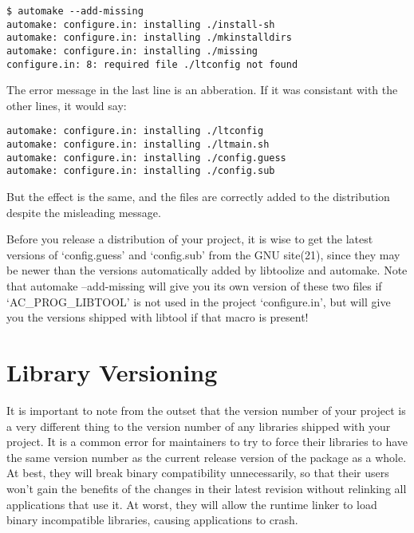\begin{verbatim}
$ automake --add-missing
automake: configure.in: installing ./install-sh
automake: configure.in: installing ./mkinstalldirs
automake: configure.in: installing ./missing
configure.in: 8: required file ./ltconfig not found
\end{verbatim}



 The error message in the last line is an abberation. If it was consistant with the other lines, it would say: 



 
\begin{verbatim}
automake: configure.in: installing ./ltconfig
automake: configure.in: installing ./ltmain.sh
automake: configure.in: installing ./config.guess
automake: configure.in: installing ./config.sub
\end{verbatim}

 But the effect is the same, and the files are correctly added to the distribution despite the misleading message. 


Before you release a distribution of your project, it is wise to get the 
latest versions of `config.guess' and `config.sub' from the GNU site(21),
since they may be newer than the versions automatically added by libtoolize 
and automake. Note that automake --add-missing will give you its own 
version of these two files if `AC\_{}PROG\_{}LIBTOOL' is not used in the 
project `configure.in', but will give you the versions shipped with libtool 
if that macro is present! 

\section{Library Versioning}\label{S_Library_Versioning}


It is important to note from the outset that the version number of your project is a very different thing to the version number of any libraries shipped with your project. It is a common error for maintainers to try to force their libraries to have the same version number as the current release version of the package as a whole. At best, they will break binary compatibility unnecessarily, so that their users won't gain the benefits of the changes in their latest revision without relinking all applications that use it. At worst, they will allow the runtime linker to load binary incompatible libraries, causing applications to crash. 


